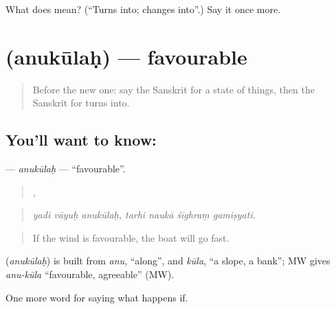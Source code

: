 \begin{tcolorbox}[breakable,colback=teal!4,colframe=teal!35!black,title={Before you move on}]
What does  mean? (\textquotedblleft{}Turns into; changes into\textquotedblright{}.) Say it once more.
\end{tcolorbox}
\section[\texorpdfstring{\sk{अनुकूलः} (anukūlaḥ)}{अनुकूलः (anukūlaḥ)}]{ (anukūlaḥ) — favourable}

\label{lesson:SA-C370-anukulah}



\begin{quote}
Before the new one: say the Sanskrit for a state of things, then the Sanskrit for turns into.
\end{quote}

\subsection*{You'll want to know: }
\textbf{} — \emph{anukūlaḥ} — \textquotedblleft{}favourable\textquotedblright{}.

\begin{quote}
  ,    
\end{quote}

\begin{quote}
\emph{yadi vāyuḥ anukūlaḥ, tarhi naukā śīghraṃ gamiṣyati.}
\end{quote}

\begin{quote}
If the wind is favourable, the boat will go fast.
\end{quote}

\begin{cousinweb}
\textbf{} (\emph{anukūlaḥ}) is built from \emph{anu}, \textquotedblleft{}along\textquotedblright{}, and \emph{kūla}, \textquotedblleft{}a slope, a bank\textquotedblright{}; MW gives \emph{anu-kūla} \textquotedblleft{}favourable, agreeable\textquotedblright{} (MW).
\end{cousinweb}

\begin{grammarlens}[title={What you've built}]
One more word for saying what happens if.
\end{grammarlens}

